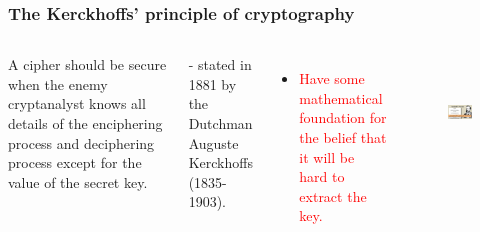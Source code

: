 \documentclass{beamer}
\begin{document}
\frame
{
\frametitle{The Kerckhoffs' principle of cryptography}

\begin{columns}[c]
A cipher should be secure when the enemy cryptanalyst knows all details of the enciphering process and deciphering process except for the value of the secret key.

\begin{flushright}
- stated in 1881 by the Dutchman Auguste Kerckhoffs (1835-1903).
\end{flushright}
\begin{itemize}
\setlength{\itemsep}{12pt}
\item \textcolor{red}{Have some mathematical foundation for the belief that it will be hard to extract the key.}
\end{itemize}

\begin{figure}[htbp]
\centering
  \includegraphics[width=4cm, height=3cm]{./pics/Kerckhoffs.jpg}
\end{figure}

\end{columns}
}

\end{document}
